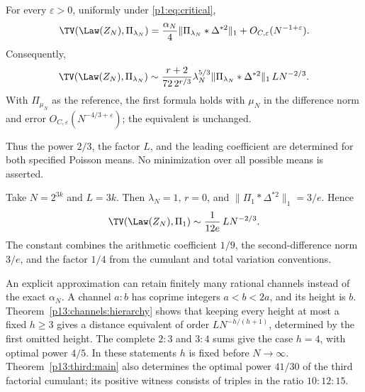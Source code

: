 \begin{corollary}
\label{p1:cor:tv}
For every \(\varepsilon>0\), uniformly under \eqref{p1:eq:critical},
\begin{equation}
 \TV(\Law(Z_N),\Pi_{\lambda_N})
 =\frac{\alpha_N}{4}\|\Pi_{\lambda_N}*\Delta^{*2}\|_1
       +O_{C,\varepsilon}(N^{-1+\varepsilon}).
 \label{p1:eq:tv-main}
\end{equation}
Consequently,
\begin{equation}
 \TV(\Law(Z_N),\Pi_{\lambda_N})
 \sim\frac{r+2}{72\,2^{r/3}}\lambda_N^{5/3}
       \|\Pi_{\lambda_N}*\Delta^{*2}\|_1\,L N^{-2/3}.
 \label{p1:eq:tv-equiv}
\end{equation}
With \(\Pi_{\mu_N}\) as the reference, the first formula holds with
\(\mu_N\) in the difference norm and error
\(O_{C,\varepsilon}(N^{-4/3+\varepsilon})\); the equivalent is
unchanged.
\end{corollary}

Thus the power \(2/3\), the factor \(L\), and the leading coefficient
are determined for both specified Poisson means. No minimization over
all possible means is asserted.

\begin{example}
\label{p1:ex:unit}
Take \(N=2^{3k}\) and \(L=3k\). Then \(\lambda_N=1\), \(r=0\),
and \(\|\Pi_1*\Delta^{*2}\|_1=3/e\). Hence
\begin{equation}
 \TV(\Law(Z_N),\Pi_1)
       \sim\frac{1}{12e}\,L N^{-2/3}.
 \label{p1:eq:unit-example}
\end{equation}
The constant combines the arithmetic coefficient \(1/9\), the
second-difference norm \(3/e\), and the factor \(1/4\) from the
cumulant and total variation conventions.
\end{example}

An explicit approximation can retain finitely many rational channels
instead of the exact \(\alpha_N\). A channel \(a:b\) has coprime
integers \(a<b<2a\), and its height is \(b\).
Theorem~\ref{p13:channels:hierarchy} shows that keeping every height
at most a fixed \(h\ge3\) gives a distance equivalent of order
\(LN^{-h/(h+1)}\), determined by the first omitted height.
The complete \(2:3\) and \(3:4\) sums give the case \(h=4\), with
optimal power \(4/5\). In these statements \(h\) is fixed before
\(N\to\infty\). Theorem~\ref{p13:third:main} also determines the
optimal power \(41/30\) of the third factorial cumulant; its
positive witness consists of triples in the ratio \(10:12:15\).


